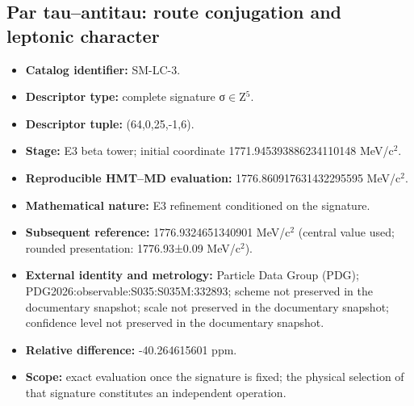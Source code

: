 \subsection{Par tau–antitau: route conjugation and leptonic character}
\begin{itemize}
\item \textbf{Catalog identifier:} SM-LC-3.
\item \textbf{Descriptor type:} complete signature σ\(\in\)Z\({}^{5}\).
\item \textbf{Descriptor tuple:} (64,0,25,-1,6).
\item \textbf{Stage:} E3 beta tower; initial coordinate 1771.945393\allowbreak{}886234\allowbreak{}110148 MeV/c\({}^{2}\).
\item \textbf{Reproducible HMT--MD evaluation:} 1776.860917\allowbreak{}631432\allowbreak{}295595 MeV/c\({}^{2}\).
\item \textbf{Mathematical nature:} E3 refinement conditioned on the signature.
\item \textbf{Subsequent reference:} 1776.932465\allowbreak{}134090\allowbreak{}1 MeV/c\({}^{2}\) (central value used; rounded presentation: 1776.93±\allowbreak{}0.09 MeV/c\({}^{2}\)).
\item \textbf{External identity and metrology:} Particle Data Group (PDG); PDG2026:\allowbreak{}observable:\allowbreak{}S035:\allowbreak{}S035M:\allowbreak{}332893; scheme not preserved in the documentary snapshot; scale not preserved in the documentary snapshot; confidence level not preserved in the documentary snapshot.
\item \textbf{Relative difference:} -40.264615\allowbreak{}601 ppm.
\item \textbf{Scope:} exact evaluation once the signature is fixed; the physical selection of that signature constitutes an independent operation.
\end{itemize}

